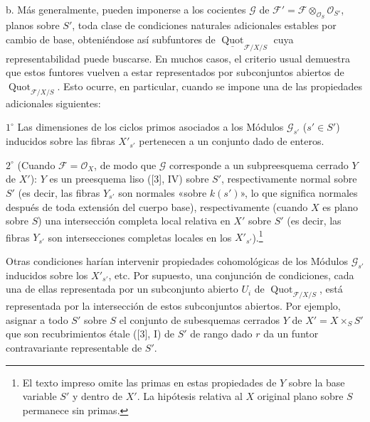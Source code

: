 \documentclass[11pt,twoside,openany]{book}
\numberwithin{equation}{section}
\theoremstyle{plain}
\theoremstyle{definition}
\theoremstyle{remark}
\theoremstyle{plain}
\theoremstyle{definition}
\theoremstyle{remark}
\begin{document}
\medskip
\noindent b. Más generalmente, pueden imponerse a los cocientes $\mathcal G$
de $\mathcal F'=\mathcal F\otimes_{\mathcal O_S}\mathcal O_{S'}$, planos
sobre $S'$, toda clase de condiciones naturales adicionales estables por
cambio de base, obteniéndose así subfuntores de
$\underline{\operatorname{Quot}}_{\mathcal F/X/S}$ cuya representabilidad
puede buscarse. En muchos casos, el criterio usual demuestra que estos
funtores vuelven a estar representados por subconjuntos abiertos de
$\operatorname{Quot}_{\mathcal F/X/S}$. Esto ocurre, en particular, cuando se
impone una de las propiedades adicionales siguientes:

\smallskip
\noindent $1^\circ$ Las dimensiones de los ciclos primos asociados a los
Módulos $\mathcal G_{s'}$ ($s'\in S'$) inducidos sobre las fibras $X'_{s'}$
pertenecen a un conjunto dado de enteros.

\smallskip
\noindent $2^\circ$ (Cuando $\mathcal F=\mathcal O_X$, de modo que
$\mathcal G$ corresponde a un subpreesquema cerrado $Y$ de $X'$): $Y$ es un
preesquema liso ([3], IV) sobre $S'$, respectivamente normal sobre $S'$ (es
decir, las fibras $Y_{s'}$ son normales «sobre $k(s')$», lo que significa
normales después de toda extensión del cuerpo base), respectivamente (cuando
$X$ es plano sobre $S$) una intersección completa local relativa en $X'$ sobre
$S'$ (es decir, las fibras $Y_{s'}$ son intersecciones completas locales en los
$X'_{s'}$).\footnote{El texto impreso omite las primas en estas propiedades de $Y$ sobre la base variable $S'$ y dentro de $X'$. La hipótesis relativa al $X$ original plano sobre $S$ permanece sin primas.}

Otras condiciones harían intervenir propiedades cohomológicas de los Módulos
$\mathcal G_{s'}$ inducidos sobre los $X'_{s'}$, etc. Por supuesto, una
conjunción de condiciones, cada una de ellas representada por un subconjunto
abierto $U_i$ de $\operatorname{Quot}_{\mathcal F/X/S}$, está representada por
la intersección de estos subconjuntos abiertos. Por ejemplo, asignar a todo
$S'$ sobre $S$ el conjunto de subesquemas cerrados $Y$ de
$X'=X\times_SS'$ que son recubrimientos étale ([3], I) de $S'$ de rango dado
$r$ da un funtor contravariante representable de $S'$.
\end{document}
